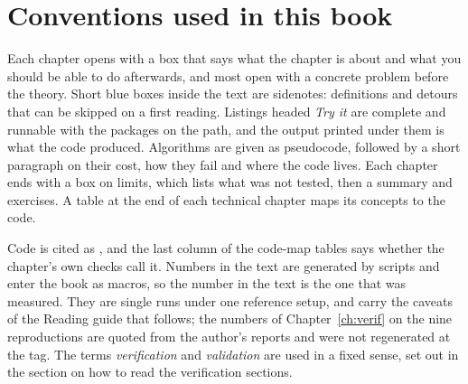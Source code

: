 \section*{Conventions used in this book}

Each chapter opens with a box that says what the chapter is about and what you should be able to do afterwards, and most open with a concrete problem before the theory. Short blue boxes inside the text are sidenotes: definitions and detours that can be skipped on a first reading. Listings headed \emph{Try it} are complete and runnable with the packages on the path, and the output printed under them is what the code produced. Algorithms are given as pseudocode, followed by a short paragraph on their cost, how they fail and where the code lives. Each chapter ends with a box on limits, which lists what was not tested, then a summary and exercises. A table at the end of each technical chapter maps its concepts to the code.

Code is cited as , and the last column of the code-map tables says whether the chapter's own checks call it. Numbers in the text are generated by scripts and enter the book as macros, so the number in the text is the one that was measured. They are single runs under one reference setup, and carry the caveats of the Reading guide that follows; the numbers of Chapter~\ref{ch:verif} on the nine reproductions are quoted from the author's reports and were not regenerated at the tag. The terms \emph{verification} and \emph{validation} are used in a fixed sense, set out in the section on how to read the verification sections.
